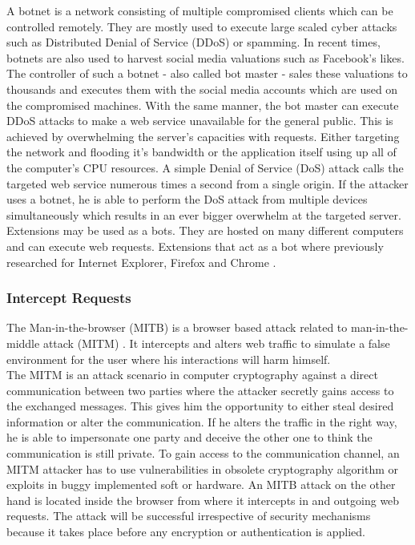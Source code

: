 		 	A botnet is a network consisting of multiple compromised clients which can be controlled remotely. They are mostly used to execute large scaled cyber attacks such as Distributed Denial of Service (DDoS) or spamming. In recent times, botnets are also used to harvest social media valuations such as Facebook's likes. The controller of such a botnet - also called bot master - sales these valuations to thousands and executes them with the social media accounts which are used on the compromised machines. With the same manner, the bot master can execute DDoS attacks to make a web service unavailable for the general public. This is achieved by overwhelming the server's capacities with requests. Either targeting the network and flooding it's bandwidth or the application itself using up all of the computer's CPU resources. A simple Denial of Service (DoS) attack calls the targeted web service numerous times a second from a single origin. If the attacker uses a botnet, he is able to perform the DoS attack from multiple devices simultaneously which results in an ever bigger overwhelm at the targeted server. \\
	 	
		 	Extensions may be used as a bots. They are hosted on many different computers and can execute web requests. 
		 	Extensions that act as a bot where previously researched for Internet Explorer, Firefox and Chrome \cite{liu2011botnet}.
	 
		\subsubsection{Intercept Requests}
		 
			The Man-in-the-browser (MITB) is a browser based attack related to man-in-the-middle attack (MITM) \cite{Curran:2012:MBA:2433195.2433198}. It intercepts and alters web traffic to simulate a false environment for the user where his interactions will harm himself. \\
			
			The MITM is an attack scenario in computer cryptography against a direct communication between two parties where the attacker secretly gains access to the exchanged messages. This gives him the opportunity to either steal desired information or alter the communication. If he alters the traffic in the right way, he is able to impersonate one party and deceive the other one to think the communication is still private. To gain access to the communication channel, an MITM attacker has to use vulnerabilities in obsolete cryptography algorithm or exploits in buggy implemented soft or hardware. An MITB attack on the other hand is located inside the browser from where it intercepts in and outgoing web requests. The attack will be successful irrespective of security mechanisms because it takes place before any encryption or authentication is applied. \\
			
